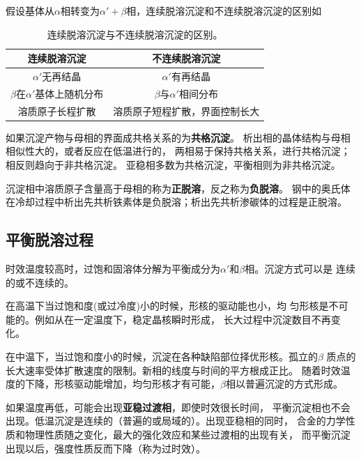             假设基体从$\alpha$相转变为$\alpha'+\beta$相，连续脱溶沉淀和不连续脱溶沉淀的区别如
            \begin{table}[ht]
                \centering
                \caption{连续脱溶沉淀与不连续脱溶沉淀的区别。}
                \label{连续脱溶沉淀与不连续脱溶沉淀的区别}
                \begin{tabular}{cc}
                    \toprule
                    连续脱溶沉淀&不连续脱溶沉淀\\
                    \midrule
                    $\alpha'$无再结晶&$\alpha'$有再结晶\\
                    $\beta$在$\alpha'$基体上随机分布&$\beta$与$\alpha'$相间分布\\
                    溶质原子长程扩散&溶质原子短程扩散，界面控制长大\\
                    \bottomrule
                \end{tabular}
            \end{table}

            如果沉淀产物与母相的界面成共格关系的为\textbf{共格沉淀}。
            析出相的晶体结构与母相相似性大的，或者反应在低温进行的，
            两相易于保持共格关系，进行共格沉淀；相反则趋向于非共格沉淀。
            亚稳相多数为共格沉淀，平衡相则为非共格沉淀。

            沉淀相中溶质原子含量高于母相的称为\textbf{正脱溶}，反之称为\textbf{负脱溶}。
            钢中的奥氏体在冷却过程中析出先共析铁素体是负脱溶；析出先共析渗碳体的过程是正脱溶。
        \subsection{平衡脱溶过程}
            时效温度较高时，过饱和固溶体分解为平衡成分为$\alpha'$和$\beta$相。沉淀方式可以是
            连续的或不连续的。

            在高温下当过饱和度(或过冷度)小的时候，形核的驱动能也小，均
            匀形核是不可能的。例如从在一定温度下，稳定晶核瞬时形成，
            长大过程中沉淀数目不再变化。

            在中温下，当过饱和度小的时候，沉淀在各种缺陷部位择优形核。孤立的$\beta$
            质点的长大速率受体扩散速度的限制。新相的线度与时间的平方根成正比。
            随着时效温度的下降，形核驱动能增加，均匀形核才有可能，$\beta$相以普遍沉淀的方式形成。

            如果温度再低，可能会出现\textbf{亚稳过渡相}，即使时效很长时间，
            平衡沉淀相也不会出现。低温沉淀是连续的（普遍的或局域的）。出现亚稳相的同时，
            合金的力学性质和物理性质随之变化，最大的强化效应和某些过渡相的出现有关，
            而平衡沉淀出现以后，强度性质反而下降（称为过时效）。
